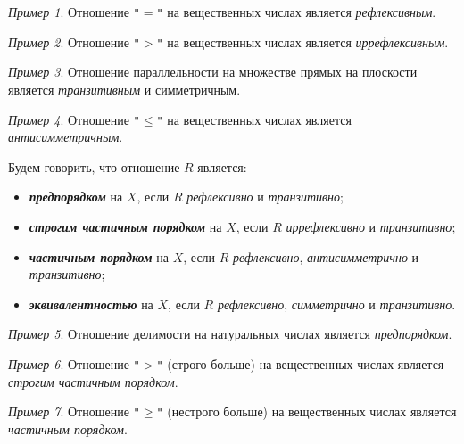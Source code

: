 \documentclass{article}
\theoremstyle{remark}
\newtheorem{example}{Пример}
\begin{document}
\begin{example}
	Отношение \texttt{"$=$"} на вещественных числах является \textit{рефлексивным}.
\end{example}

\begin{example}
	Отношение \texttt{"$>$"} на вещественных числах является \textit{иррефлексивным}.
\end{example}

\begin{example}
Отношение параллельности на множестве прямых на плоскости является \textit{транзитивным} и симметричным.
\end{example}

\begin{example}
Отношение \texttt{"$\leqslant$"} на вещественных числах является \textit{антисимметричным}.
\end{example}

\begin{definition}
Будем говорить, что отношение $R$ является:
\begin{itemize}
\item \textbf{\textit{предпорядком}} на $X$, если $R$ \textit{рефлексивно} и \textit{транзитивно};
\item \textbf{\textit{строгим частичным порядком}} на $X$, если $R$ \textit{иррефлексивно} и \textit{транзитивно};
\item \textbf{\textit{частичным порядком}} на $X$, если $R$ \textit{рефлексивно}, \textit{антисимметрично} и \textit{транзитивно}; 
\item \textbf{\textit{эквивалентностью}} на $X$, если $R$ \textit{рефлексивно}, \textit{симметрично} и \textit{транзитивно}.
\end{itemize}

\end{definition}

\begin{example}
	Отношение делимости на натуральных числах является \textit{предпорядком}.
\end{example}

\begin{example}
	Отношение \texttt{"$>$"} (строго больше) на вещественных числах является \textit{строгим частичным порядком}.
\end{example}

\begin{example}
	Отношение \texttt{"$\geqslant$"} (нестрого больше) на вещественных числах является 	\textit{частичным порядком}.
\end{example}
\end{document}
